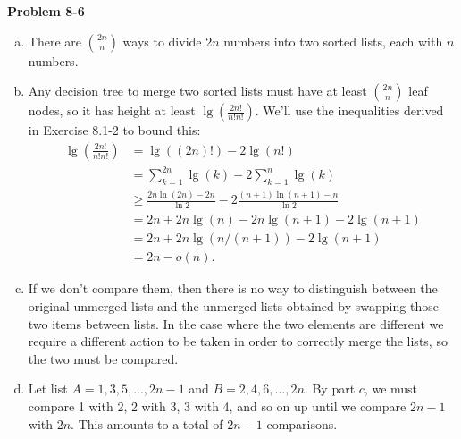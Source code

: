 \documentclass{article}
\begin{document}
\noindent\textbf{Problem 8-6}\\
\begin{enumerate}[a.]
\item There are ${2n \choose n}$ ways to divide $2n$ numbers into two sorted lists, each with $n$ numbers.\\

\item Any decision tree to merge two sorted lists must have at least ${2n \choose n}$ leaf nodes, so it has height at least $\lg\left(\frac{2n!}{n!n!}\right)$.  We'll use the inequalities derived in Exercise 8.1-2 to bound this:
\begin{align*}
\lg\left(\frac{2n!}{n!n!}\right) &= \lg((2n)!) - 2\lg(n!) \\
&= \sum_{k=1}^{2n} \lg(k) - 2\sum_{k=1}^n \lg(k) \\
& \geq \frac{2n \ln(2n) - 2n}{\ln 2} - 2\frac{(n+1)\ln(n+1) - n}{\ln 2} \\
&= 2n + 2n\lg(n) - 2n\lg(n+1) - 2\lg(n+1) \\
&= 2n + 2n\lg(n/(n+1)) - 2\lg(n+1) \\
&= 2n - o(n).
\end{align*}

\item If we don't compare them, then there is no way to distinguish between the original unmerged lists and the unmerged lists obtained by swapping those two items between lists.  In the case where the two elements are different we require a different action to be taken in order to correctly merge the lists, so the two must be compared.\\

\item Let list $A = 1, 3, 5, ..., 2n-1$ and $B = 2, 4, 6, \ldots, 2n$. By part $c$, we must compare 1 with 2, 2 with 3, 3 with 4, and so on up until we compare $2n-1$ with $2n$. This amounts to a total of $2n-1$ comparisons. 
\end{enumerate}
\end{document}
